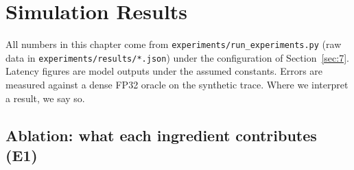 \documentclass[12pt,a4paper]{report}
\begin{document}
\section{Simulation Results}\label{sec:8}
All numbers in this chapter come from \texttt{experiments/\allowbreak{}run\_\allowbreak{}\allowbreak{}experiments.\allowbreak{}py} (raw data in \texttt{experiments/\allowbreak{}results/\allowbreak{}*.\allowbreak{}json}) under the configuration of Section~\ref{sec:7}. Latency figures are model outputs under the assumed constants. Errors are measured against a dense FP32 oracle on the synthetic trace. Where we interpret a result, we say so.

\subsection{Ablation: what each ingredient contributes (E1)}\label{sec:8_1}
\end{document}
